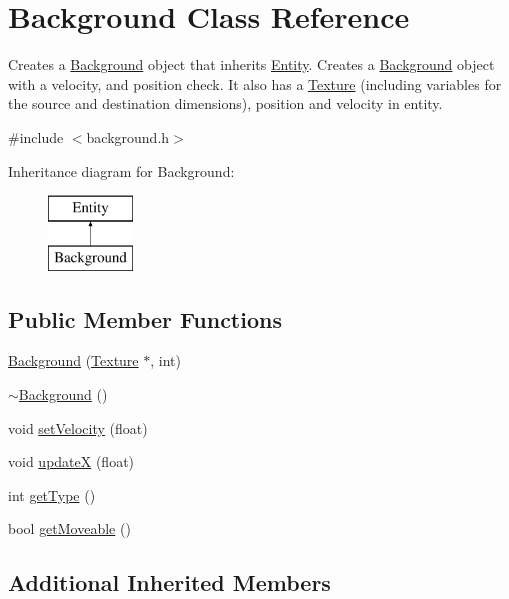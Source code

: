 \hypertarget{class_background}{\section{Background Class Reference}
\label{class_background}
}


Creates a \hyperlink{class_background}{Background} object that inherits \hyperlink{class_entity}{Entity}. Creates a \hyperlink{class_background}{Background} object with a velocity, and position check. It also has a \hyperlink{class_texture}{Texture} (including variables for the source and destination dimensions), position and velocity in entity.  




{\ttfamily \#include $<$background.\+h$>$}

Inheritance diagram for Background\+:\begin{figure}[H]
\begin{center}
\leavevmode
\includegraphics[height=2.000000cm]{class_background}
\end{center}
\end{figure}
\subsection*{Public Member Functions}
\begin{DoxyCompactItemize}
\item 
\hyperlink{class_background_a31d67c19cf5dd14c0f07b91e89c8b1f8}{Background} (\hyperlink{class_texture}{Texture} $\ast$, int)
\item 
\hyperlink{class_background_a36754df1deb720393217ade59da41557}{$\sim$\+Background} ()
\item 
void \hyperlink{class_background_a9b358e049be63be31b9241410288514f}{set\+Velocity} (float)
\item 
void \hyperlink{class_background_a1cb5afc5d8857ec4db6c6d393375a4c2}{update\+X} (float)
\item 
int \hyperlink{class_background_a25e0286050106340c34d91d3f1d0f4df}{get\+Type} ()
\item 
bool \hyperlink{class_background_a5f3e6259bb294391cf39d776456e7748}{get\+Moveable} ()
\end{DoxyCompactItemize}
\subsection*{Additional Inherited Members}


